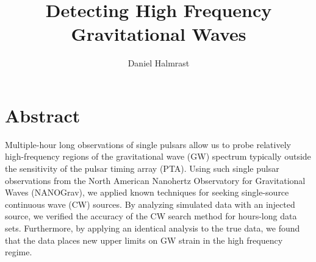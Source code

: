\documentclass[12pt]{article}
\begin{document}
\title{Detecting High Frequency Gravitational Waves}
\author{Daniel Halmrast}

\maketitle

\section{Abstract}
Multiple-hour long observations of single pulsars allow us to probe relatively
high-frequency regions of the gravitational wave (GW) spectrum typically outside
the sensitivity of the pulsar timing array (PTA). Using such single pulsar
observations from the North American Nanohertz Observatory for Gravitational
Waves (NANOGrav), we applied known techniques for seeking single-source continuous
wave (CW) sources. By analyzing simulated data with an injected source, we
verified the accuracy of the CW search method for hours-long data sets.
Furthermore, by applying an identical analysis to the true data, we found that
the data places new upper limits on GW strain in the high frequency regime.
\end{document}

